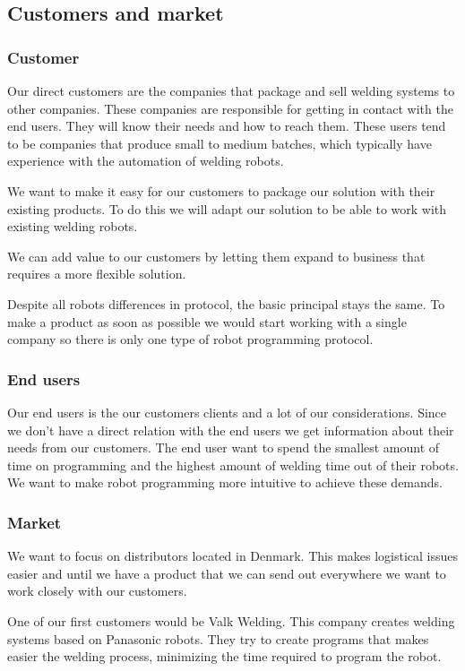 \subsection{Customers and market}

\subsubsection{Customer}
Our direct customers are the companies that package and sell welding systems to other companies. 
These companies are responsible for getting in contact with the end users. 
They will know their needs and how to reach them. 
These users tend to be companies that produce small to medium batches, which typically have experience with the automation of welding robots.

We want to make it easy for our customers to package our solution with their existing products.
To do this we will adapt our solution to be able to work with existing welding robots.

We can add value to our customers by letting them expand to business that requires a more flexible solution.

Despite all robots differences in protocol, the basic principal stays the same.
To make a product as soon as possible we would start working with a single company so there is only one type of robot programming protocol.

\subsubsection{End users}
Our end users is the our customers clients and a lot of our considerations.
Since we don't have a direct relation with the end users we get information about their needs from our customers.
The end user want to spend the smallest amount of time on programming and the highest amount of welding time out of their robots.
We want to make robot programming more intuitive to achieve these demands.

\subsubsection{Market}
We want to focus on distributors located in Denmark.
This makes logistical issues easier and until we have a product that we can send out everywhere we want to work closely with our customers.

One of our first customers would be Valk Welding. This company creates welding systems based on Panasonic robots. They try to create programs that makes easier the welding process, minimizing the time required to program the robot.

